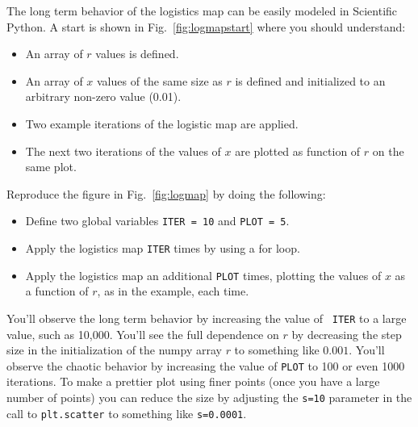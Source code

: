 The long term behavior of the logistics map can be easily modeled in
Scientific Python.  A start is shown in Fig.~\ref{fig:logmapstart}
where you should understand:
\begin{itemize}
\item An array of $r$ values is defined.
\item An array of $x$ values of the same size as $r$ is defined and initialized to an arbitrary non-zero value (0.01).
\item Two example iterations of the logistic map are applied.
\item The next two iterations of the values of $x$ are plotted as function of $r$ on the same plot.
\end{itemize}

\noindent
\begin{plot} \end{plot} Reproduce the figure in Fig.~\ref{fig:logmap} by doing the following:
\begin{itemize}
\item Define two global variables {\tt ITER = 10} and {\tt PLOT = 5}.
\item Apply the logistics map {\tt ITER} times by using a for loop.
\item Apply the logistics map an additional {\tt PLOT} times, plotting the values of $x$ as a function of $r$, as in the example, each time.
\end{itemize}
You'll observe the long term behavior by increasing the value of {\tt
  ITER} to a large value, such as 10,000.  You'll see the full
dependence on $r$ by decreasing the step size in the initialization of
the numpy array $r$ to something like $0.001$.  You'll observe the
chaotic behavior by increasing the value of {\tt PLOT} to 100 or even
1000 iterations.  To make a prettier plot using finer points (once you
have a large number of points) you can reduce the size by adjusting
the {\tt s=10} parameter in the call to {\tt plt.scatter} to something
like {\tt s=0.0001}.


